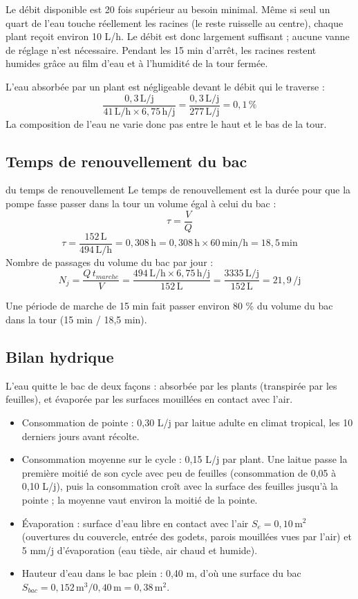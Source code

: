 \documentclass[11pt,a4paper]{article}
\newcommand{\U}[1]{\,\mathrm{#1}}
\begin{document}
Le débit disponible est 20 fois supérieur au besoin minimal. Même si seul un quart de l'eau touche réellement les racines (le reste ruisselle au centre), chaque plant reçoit environ 10 L/h. Le débit est donc largement suffisant ; aucune vanne de réglage n'est nécessaire. Pendant les 15 min d'arrêt, les racines restent humides grâce au film d'eau et à l'humidité de la tour fermée.

L'eau absorbée par un plant est négligeable devant le débit qui le traverse :
\[ \frac{0{,}3\U{L/j}}{41\U{L/h}\times6{,}75\U{h/j}} = \frac{0{,}3\U{L/j}}{277\U{L/j}} = 0{,}1\,\% \]
La composition de l'eau ne varie donc pas entre le haut et le bas de la tour.

\subsection{Temps de renouvellement du bac}

\begin{calcul}{du temps de renouvellement}
Le temps de renouvellement est la durée pour que la pompe fasse passer dans la tour un volume égal à celui du bac :
\[ \tau = \frac{V}{Q} \]
\[ \tau = \frac{152\U{L}}{494\U{L/h}} = 0{,}308\U{h} = 0{,}308\U{h}\times60\U{min/h} = 18{,}5\U{min} \]
Nombre de passages du volume du bac par jour :
\[ N_j = \frac{Q\,t_{marche}}{V} = \frac{494\U{L/h}\times6{,}75\U{h/j}}{152\U{L}} = \frac{3335\U{L/j}}{152\U{L}} = 21{,}9\U{/j} \]
\end{calcul}

Une période de marche de 15 min fait passer environ 80 \% du volume du bac dans la tour (15 min / 18,5 min).

\subsection{Bilan hydrique}

L'eau quitte le bac de deux façons : absorbée par les plants (transpirée par les feuilles), et évaporée par les surfaces mouillées en contact avec l'air.

\begin{hypo}
\begin{itemize}
  \item Consommation de pointe : 0,30 L/j par laitue adulte en climat tropical, les 10 derniers jours avant récolte.
  \item Consommation moyenne sur le cycle : 0,15 L/j par plant. Une laitue passe la première moitié de son cycle avec peu de feuilles (consommation de 0,05 à 0,10 L/j), puis la consommation croît avec la surface des feuilles jusqu'à la pointe ; la moyenne vaut environ la moitié de la pointe.
  \item Évaporation : surface d'eau libre en contact avec l'air $S_e = 0{,}10\U{m^2}$ (ouvertures du couvercle, entrée des godets, parois mouillées vues par l'air) et 5 mm/j d'évaporation (eau tiède, air chaud et humide).
  \item Hauteur d'eau dans le bac plein : 0,40 m, d'où une surface du bac $S_{bac} = 0{,}152\U{m^3}/0{,}40\U{m} = 0{,}38\U{m^2}$.
\end{itemize}
\end{hypo}
\end{document}
